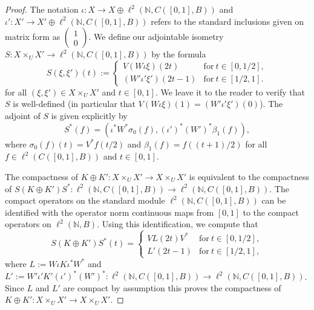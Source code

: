 \documentclass[11pt]{article}
\numberwithin{equation}{section}
\newcommand{\op}{\oplus}
\newcommand{\ti}{\times}
\newcommand{\nn}{\mathbb{N}}
\newcommand{\be}{\beta}
\newcommand{\io}{\iota}
\newcommand{\si}{\sigma}
\begin{document}
\begin{proof}
The notation $\io\colon X \to X \op \ell^2(\nn,C([0,1],B))$ and $\io'\colon X' \to X' \op \ell^2(\nn,C([0,1],B))$ refers to the standard inclusions given on matrix form as $\left(\begin{smallmatrix} 1 \\ 0\end{smallmatrix}\right)$. We define our adjointable isometry $S\colon X \ti_U X' \to \ell^2( \nn, C([0,1],B))$ by the formula
\[
S(\xi,\xi')(t) := \begin{cases}
V( W \io \xi)(2t) & \text{for} \ t \in [0,1/2], \\ (W' \io' \xi')(2t - 1) & \text{for} \ t \in [1/2,1].\end{cases}
\]
for all $(\xi,\xi') \in X \ti_U X'$ and $t \in [0,1]$. We leave it to the reader to verify that $S$ is well-defined (in particular that $V(W \io \xi)(1) = (W' \io'\xi')(0)$). The adjoint of $S$ is given explicitly by
\[
S^*(f) = ( \io^* W^* \si_0(f), (\io')^* (W')^*\be_1(f)),
\]
where $\si_0(f)(t) = V^* f(t/2)$ and $\be_1(f) = f((t + 1)/2)$ for all $f \in \ell^2(C([0,1],B))$ and $t \in [0,1]$.

The compactness of $K \op K'\colon X \ti_U X' \to X \ti_U X'$ is equivalent to the compactness of $S (K \op K') S^*\colon \ell^2(\nn,C([0,1],B)) \to \ell^2(\nn,C([0,1],B))$. The compact operators on the standard module $\ell^2(\nn,C([0,1],B))$ can be identified with the operator norm continuous maps from $[0,1]$ to the compact operators on $\ell^2(\nn,B)$. Using this identification, we compute that
\[
S (K \op K') S^* (t) = \begin{cases} V L(2t) V^* & \text{for} \ t \in [0,1/2], \\ L'(2t - 1) & \text{for} \ t \in [1/2,1] ,\end{cases}
\]
where $L := W \io K \io^* W^*$ and $L' := W' \io' K' (\io')^* (W')^*\colon \ell^2(\nn,C([0,1],B)) \to \ell^2(\nn,C([0,1],B))$. Since $L$ and $L'$ are compact by assumption this proves the compactness of $K \op K'\colon X \ti_U X' \to X \ti_U X'$.
\end{proof}
\end{document}
